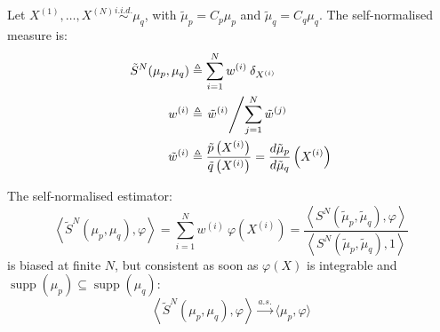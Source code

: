 \begin{definition}\label{th:self_normalised_measure}
	Let $X^{(1)}, \dots,X^{(N)}\overset{i.i.d.}{\sim}\mu_q$, with $\tilde{\mu}_p=C_p\mu_p$ and $\tilde{\mu}_q=C_q\mu_q$. The self-normalised measure is:
	\begin{align}
		\tilde{S}^N(\mu_p,\mu_q)&\triangleq\sum_{i=1}^Nw^{(i)}\:\delta_{X^{(i)}}\label{eq:self_normalised_estimator}\\
		w^{(i)}&\triangleq\left.\tilde{w}^{(i)}\middle/\sum_{j=1}^N\tilde{w}^{(j)}\right.\\
		\tilde{w}^{(i)}&\triangleq\frac{\tilde{p}\left(X^{(i)}\right)}{\tilde{q}\left(X^{(i)}\right)}=\frac{d\tilde{\mu}_p}{d\tilde{\mu}_q}\left(X^{(i)}\right)
	\end{align}
\end{definition}

\begin{proposition}\label{th:self_normalised_estimator}
	The self-normalised estimator:
	\begin{equation}
		\left\langle\tilde{S}^N(\mu_p,\mu_q),\varphi\right\rangle=\sum_{i=1}^Nw^{(i)}\:\varphi\left(X^{(i)}\right)=\frac{\displaystyle\left\langle S^N(\tilde{\mu}_p,\tilde{\mu}_q),\varphi\right\rangle}{\displaystyle\left\langle S^N(\tilde{\mu}_p,\tilde{\mu}_q),1\right\rangle}
	\end{equation}
	is biased at finite $N$, but consistent as soon as $\varphi(X)$ is integrable and $\operatorname{supp}(\mu_p)\subseteq\operatorname{supp}(\mu_q)$:
	\begin{equation}
		\left\langle\tilde{S}^N(\mu_p,\mu_q),\varphi\right\rangle\overset{a.s.}{\longrightarrow}\langle\mu_p,\varphi\rangle
	\end{equation}
\end{proposition}

